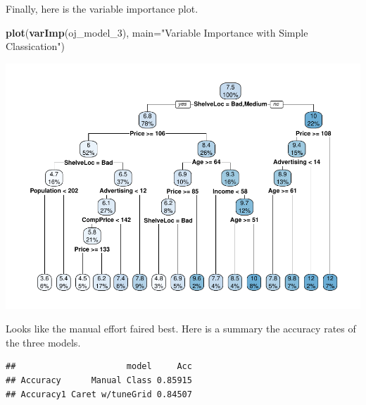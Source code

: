 \documentclass[
]{book}
\newenvironment{Shaded}{\begin{snugshade}}{\end{snugshade}}
\newcommand{\DataTypeTok}[1]{\textcolor[rgb]{0.13,0.29,0.53}{#1}}
\newcommand{\DecValTok}[1]{\textcolor[rgb]{0.00,0.00,0.81}{#1}}
\newcommand{\KeywordTok}[1]{\textcolor[rgb]{0.13,0.29,0.53}{\textbf{#1}}}
\newcommand{\NormalTok}[1]{#1}
\newcommand{\OperatorTok}[1]{\textcolor[rgb]{0.81,0.36,0.00}{\textbf{#1}}}
\newcommand{\StringTok}[1]{\textcolor[rgb]{0.31,0.60,0.02}{#1}}
\begin{document}
Finally, here is the variable importance plot.

\begin{Shaded}
\begin{Highlighting}[]
\KeywordTok{plot}\NormalTok{(}\KeywordTok{varImp}\NormalTok{(oj_model_}\DecValTok{3}\NormalTok{), }\DataTypeTok{main=}\StringTok{"Variable Importance with Simple Classication"}\NormalTok{)}
\end{Highlighting}
\end{Shaded}

\includegraphics{data-sci_files/figure-latex/unnamed-chunk-60-1.pdf}

Looks like the manual effort faired best. Here is a summary the accuracy rates of the three models.

\begin{Shaded}
\end{Shaded}

\begin{verbatim}
##                      model     Acc
## Accuracy      Manual Class 0.85915
## Accuracy1 Caret w/tuneGrid 0.84507
\end{verbatim}
\end{document}
